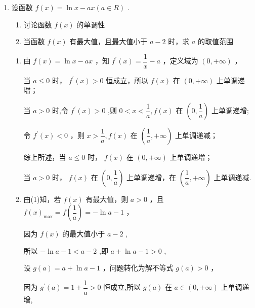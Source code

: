 \begin{enumerate}
\begin{enumerate}
        \item 设函数 $f\left( x\right)  = \ln x - {ax}\left( {a \in  R}\right)$ .
        \begin{enumerate}
            \item 讨论函数 $f\left( x\right)$ 的单调性
            \item 当函数 $f\left( x\right)$ 有最大值，且最大值小于 $a - 2$ 时，求 $a$ 的取值范围
        \end{enumerate}
        \begin{jieda}
            \begin{enumerate}
                \item 由 $f\left( x\right)  = \ln x - {ax}$ ，知 ${f}^{\prime }\left( x\right)  = \dfrac{1}{x} - a$ ，定义域为 $\left( {0, + \infty }\right)$ ，
                
                当 $a \leq  0$ 时， ${f}^{\prime }\left( x\right)  > 0$ 恒成立，所以 $f\left( x\right)$ 在 $\left( {0, + \infty }\right)$ 上单调递增；
                
                当 $a > 0$ 时,令 ${f}^{\prime }\left( x\right)  > 0$ ,则 $0 < x < \dfrac{1}{a},f\left( x\right)$ 在 $\left( {0,\dfrac{1}{a}}\right)$ 上单调递增;
                
                令 ${f}^{\prime }\left( x\right)  < 0$ ，则 $x > \dfrac{1}{a},f\left( x\right)$ 在 $\left( {\dfrac{1}{a}, + \infty }\right)$ 上单调递减；
                
                综上所述，当 $a \leq  0$ 时， $f\left( x\right)$ 在 $\left( {0, + \infty }\right)$ 上单调递增；
                
                当 $a > 0$ 时， $f\left( x\right)$ 在 $\left( {0,\dfrac{1}{a}}\right)$ 上单调递增，在 $\left( {\dfrac{1}{a}, + \infty }\right)$ 上单调递减.

                \item 由(1)知，若 $f\left( x\right)$ 有最大值，则 $a > 0$ ，且 $f{\left( x\right) }_{\max } = f\left( \dfrac{1}{a}\right)  =  - \ln a - 1$ ，
                
                因为 $f\left( x\right)$ 的最大值小于 $a - 2$ ,
                
                所以 $- \ln a - 1 < a - 2$ ,即 $a + \ln a - 1 > 0$ ,
                
                设 $g\left( a\right)  = a + \ln a - 1$ ，问题转化为解不等式 $g\left( a\right)  > 0$ ，
                
                因为 ${g}^{\prime }\left( a\right)  = 1 + \dfrac{1}{a} > 0$ 恒成立,所以 $g\left( a\right)$ 在 $a \in  \left( {0, + \infty }\right)$ 上单调递增,
                

\end{enumerate}
\end{jieda}
\end{enumerate}
\end{enumerate}
